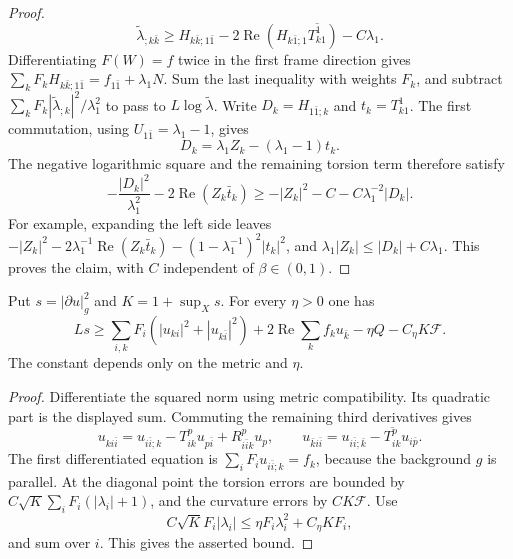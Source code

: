 \begin{proof}
\[
 \widetilde\lambda_{;k\bar k}\geq
 H_{k\bar k;1\bar1}
 -2\operatorname{Re}(H_{k\bar1;1}\overline{T^1_{k1}})-C\lambda_1.
\]
Differentiating $F(W)=f$ twice in the first frame direction gives $\sum_kF_kH_{k\bar k;1\bar1}=f_{1\bar1}+\lambda_1N$. Sum the last inequality with weights $F_k$, and subtract $\sum_kF_k|\widetilde\lambda_{;k}|^2/\lambda_1^2$ to pass to $L\log\widetilde\lambda$. Write $D_k=H_{1\bar1;k}$ and $t_k=T^1_{k1}$. The first commutation, using $U_{1\bar1}=\lambda_1-1$, gives
\[
 D_k=\lambda_1Z_k-(\lambda_1-1)t_k.
\]
The negative logarithmic square and the remaining torsion term therefore satisfy
\[
 -\frac{|D_k|^2}{\lambda_1^2}-2\operatorname{Re}(Z_k\bar t_k)
 \geq-|Z_k|^2-C-C\lambda_1^{-2}|D_k|.
\]
For example, expanding the left side leaves $-|Z_k|^2-2\lambda_1^{-1}\operatorname{Re}(Z_k\bar t_k)-(1-\lambda_1^{-1})^2|t_k|^2$, and $\lambda_1|Z_k|\leq|D_k|+C\lambda_1$. This proves the claim, with $C$ independent of $\beta\in(0,1)$.
\end{proof}

\begin{lemma}\label{hessian:hermitian-gradient-commutation}
Put $s=|\partial u|_g^2$ and $K=1+\sup_Xs$. For every $\eta>0$ one has
\[
 Ls\geq\sum_{i,k}F_i(|u_{ki}|^2+|u_{k\bar i}|^2)
 +2\operatorname{Re}\sum_k f_k u_{\bar k}-\eta Q-C_\eta K\mathcal F.
\]
The constant depends only on the metric and $\eta$.
\end{lemma}
\begin{proof}
Differentiate the squared norm using metric compatibility. Its quadratic part is the displayed sum. Commuting the remaining third derivatives gives
\[
 u_{ki\bar i}=u_{i\bar i;k}-T^p_{ik}u_{p\bar i}
                  +R^p_{i\bar i k}u_p,
 \qquad
 u_{\bar k i\bar i}=u_{i\bar i;\bar k}
                  -\overline{T^p_{ik}}u_{i\bar p}.
\]
The first differentiated equation is $\sum_iF_i u_{i\bar i;k}=f_k$, because the background $g$ is parallel. At the diagonal point the torsion errors are bounded by $C\sqrt K\sum_iF_i(|\lambda_i|+1)$, and the curvature errors by $CK\mathcal F$. Use
\[
 C\sqrt K F_i|\lambda_i|
       \leq\eta F_i\lambda_i^2+C_\eta KF_i,
\]
and sum over $i$. This gives the asserted bound.
\end{proof}

